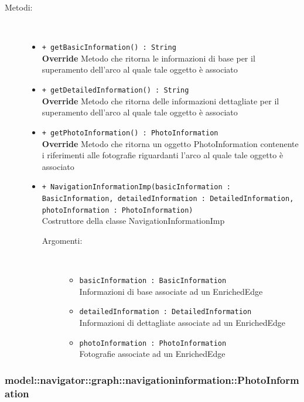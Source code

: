\documentclass[../DefinizioneDiProdotto.tex]{subfiles}
\begin{document}
\begin{description}
\begin{itemize}
\end{itemize}
\item[Metodi:] \
\begin{itemize}
\item \texttt{+ getBasicInformation() : String}\\
\textbf{Override} Metodo che ritorna le informazioni di base per il superamento dell'arco al quale tale oggetto è associato
 \item \texttt{+ getDetailedInformation() : String}\\
\textbf{Override} Metodo che ritorna delle informazioni dettagliate per il superamento dell'arco al quale tale oggetto è associato
 \item \texttt{+ getPhotoInformation() : PhotoInformation}\\
\textbf{Override} Metodo che ritorna un oggetto PhotoInformation contenente i riferimenti alle fotografie riguardanti l'arco al quale tale oggetto è associato
 \item \texttt{+ NavigationInformationImp(basicInformation : BasicInformation, detailedInformation : DetailedInformation, photoInformation : PhotoInformation)}\\
Costruttore della classe NavigationInformationImp
 \begin{description}
\item[Argomenti:] \
\begin{itemize}
\item \texttt{basicInformation : BasicInformation}\\
Informazioni di base associate ad un EnrichedEdge\item \texttt{detailedInformation : DetailedInformation}\\
Informazioni di dettagliate associate ad un EnrichedEdge\item \texttt{photoInformation : PhotoInformation}\\
Fotografie associate ad un EnrichedEdge\end{itemize}
\end{description}
\end{itemize}
\end{description}

\subsubsection{model::navigator::graph::navigationinformation::PhotoInformation}
\end{document}
